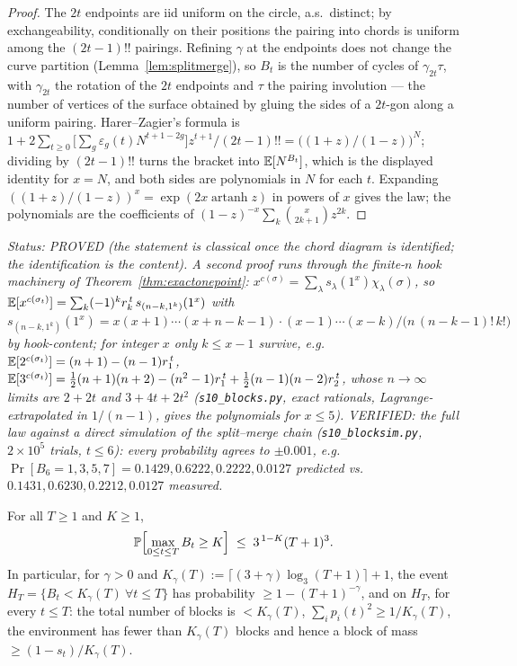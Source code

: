 \begin{proof}
The $2t$ endpoints are iid uniform on the circle, a.s.\ distinct; by
exchangeability, conditionally on their positions the pairing into
chords is uniform among the $(2t-1)!!$ pairings.  Refining $\gamma$ at
the endpoints does not change the curve partition
(Lemma~\ref{lem:splitmerge}), so $B_t$ is the number of cycles of
$\gamma_{2t}\tau$, with $\gamma_{2t}$ the rotation of the $2t$
endpoints and $\tau$ the pairing involution --- the number of vertices
of the surface obtained by gluing the sides of a $2t$-gon along a
uniform pairing.  Harer--Zagier's formula \cite{HZ86} is
$1+2\sum_{t\ge0}\bigl[\sum_g\varepsilon_g(t)N^{t+1-2g}\bigr]
z^{t+1}/(2t-1)!!=\bigl((1+z)/(1-z)\bigr)^N$; dividing by $(2t-1)!!$ turns
the bracket into $\E[N^{B_t}]$, which is the displayed identity for
$x=N$, and both sides are polynomials in $N$ for each $t$.  Expanding
$((1+z)/(1-z))^x=\exp(2x\operatorname{artanh}z)$ in powers of $x$ gives
the law; the polynomials are the coefficients of
$(1-z)^{-x}\sum_k\binom{x}{2k+1}z^{2k}$.
\end{proof}

\emph{Status: PROVED (the statement is classical once the chord
diagram is identified; the identification is the content).  A second
proof runs through the finite-$n$ hook machinery of
Theorem~\ref{thm:exactonepoint}: $x^{c(\sigma)}=\sum_\lambda
s_\lambda(1^x)\chi_\lambda(\sigma)$, so
$\E[x^{c(\sigma_t)}]=\sum_{k}(-1)^k r_k^{\,t}\,s_{(n-k,1^k)}(1^x)$ with
$s_{(n-k,1^k)}(1^x)=x(x{+}1)\cdots(x{+}n{-}k{-}1)\cdot(x{-}1)\cdots(x{-}k)
/\bigl(n\,(n{-}k{-}1)!\,k!\bigr)$ by hook-content; for integer $x$ only
$k\le x-1$ survive, e.g.\ $\E[2^{c(\sigma_t)}]=(n+1)-(n-1)r_1^{\,t}$,
$\E[3^{c(\sigma_t)}]=\tfrac12(n+1)(n+2)-(n^2-1)r_1^{\,t}+\tfrac12(n-1)(n-2)r_2^{\,t}$,
whose $n\to\infty$ limits are $2+2t$ and $3+4t+2t^2$
(\texttt{s10\_blocks.py}, exact rationals, Lagrange-extrapolated in
$1/(n-1)$, gives the polynomials for $x\le5$).  VERIFIED: the full law
against a direct simulation of the split--merge chain
(\texttt{s10\_blocksim.py}, $2\times10^5$ trials, $t\le6$): every
probability agrees to $\pm0.001$, e.g.\ $\Pr[B_6=1,3,5,7]=
0.1429,0.6222,0.2222,0.0127$ predicted vs.\ $0.1431,0.6230,0.2212,0.0127$
measured.}

\begin{corollary}\label{cor:horizon}
For all $T\ge1$ and $K\ge1$,
\[
\Pr\Bigl[\max_{0\le t\le T}B_t\ge K\Bigr]\;\le\;3^{\,1-K}(T+1)^3 .
\]
In particular, for $\gamma>0$ and
$K_\gamma(T):=\lceil(3+\gamma)\log_3(T+1)\rceil+1$, the event
$H_T=\{B_t<K_\gamma(T)\ \forall t\le T\}$ has probability
$\ge1-(T+1)^{-\gamma}$, and on $H_T$, for every $t\le T$: the total number of
blocks is $<K_\gamma(T)$, $\sum_ip_i(t)^2\ge1/K_\gamma(T)$, the
environment has fewer than $K_\gamma(T)$ blocks and hence a block of
mass $\ge(1-s_t)/K_\gamma(T)$.
\end{corollary}

